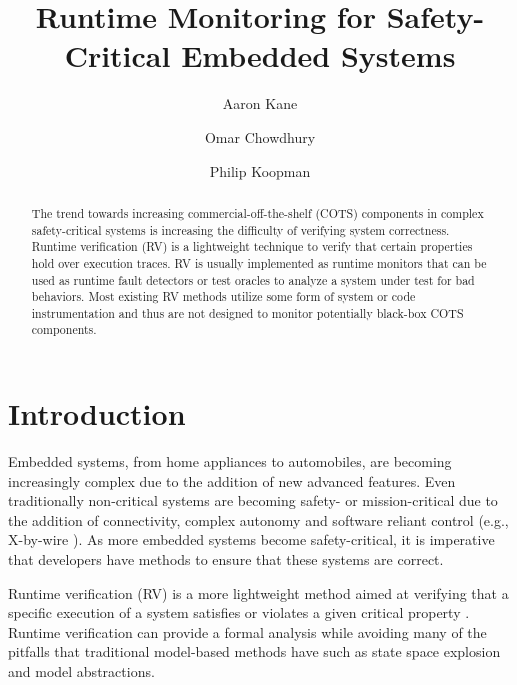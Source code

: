 \documentclass[]{../llncs/llncs}
\begin{document}
\title{Runtime Monitoring for Safety-Critical Embedded Systems}


\author{Aaron Kane \and Omar Chowdhury \and Philip Koopman}



\maketitle


\begin{abstract}
The trend towards increasing commercial-off-the-shelf (COTS) components in complex safety-critical systems is increasing the difficulty of verifying system correctness. 
Runtime verification (RV) is a lightweight technique to verify that certain properties hold over execution traces.
%
RV is usually implemented as runtime monitors that can be used as runtime fault detectors or test oracles to analyze a system under test for bad behaviors.
%
Most existing RV methods utilize some form of system or code instrumentation and thus are not designed to monitor potentially black-box COTS components.

%
%
\end{abstract}


\section{Introduction}
Embedded systems, from home appliances to automobiles, are becoming increasingly complex due to the addition of new advanced features. 
Even traditionally non-critical systems are becoming safety- or mission-critical due to the addition of connectivity, complex autonomy and software reliant control (e.g., X-by-wire \cite{Leen2002}).
%
As more embedded systems become safety-critical, it is imperative that developers have methods to ensure that these systems are correct. 

Runtime verification (RV) is a more lightweight method aimed at verifying that a specific execution of a system satisfies or violates a given critical property \cite{Leucker2009}. 
%
Runtime verification can provide a formal analysis while avoiding many of the pitfalls that traditional model-based methods have such as state space explosion and model abstractions. 
\end{document}
